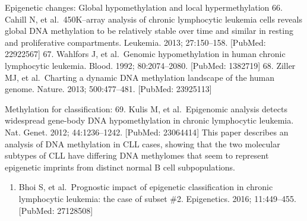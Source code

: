\documentclass[11pt, a4paper, twosided]{book}
\providecommand{\tightlist}{%
  \setlength{\itemsep}{0pt}\setlength{\parskip}{0pt}}
\begin{document}
Epigenetic changes:
Global hypomethylation and local hypermethylation
66. Cahill N, et al.~450K--array analysis of chronic lymphocytic leukemia cells reveals global DNA
methylation to be relatively stable over time and similar in resting and proliferative compartments. Leukemia. 2013; 27:150--158. {[}PubMed: 22922567{]}
67. Wahlfors J, et al.~Genomic hypomethylation in human chronic lymphocytic leukemia. Blood. 1992; 80:2074--2080. {[}PubMed: 1382719{]}
68. Ziller MJ, et al.~Charting a dynamic DNA methylation landscape of the human genome. Nature. 2013; 500:477--481. {[}PubMed: 23925113{]}

Methylation for classification:
69. Kulis M, et al.~Epigenomic analysis detects widespread gene-body DNA hypomethylation in chronic lymphocytic leukemia. Nat. Genet. 2012; 44:1236--1242. {[}PubMed: 23064414{]} This paper describes an analysis of DNA methylation in CLL cases, showing that the two molecular subtypes of CLL have differing DNA methylomes that seem to represent epigenetic imprints from distinct normal B cell subpopulations.
\begin{enumerate}
\def\labelenumi{\arabic{enumi}.}
\setcounter{enumi}{73}
\tightlist
\item
  Bhoi S, et al.~Prognostic impact of epigenetic classification in chronic lymphocytic leukemia: the
  case of subset \#2. Epigenetics. 2016; 11:449--455. {[}PubMed: 27128508{]}
\end{enumerate}
\end{document}
